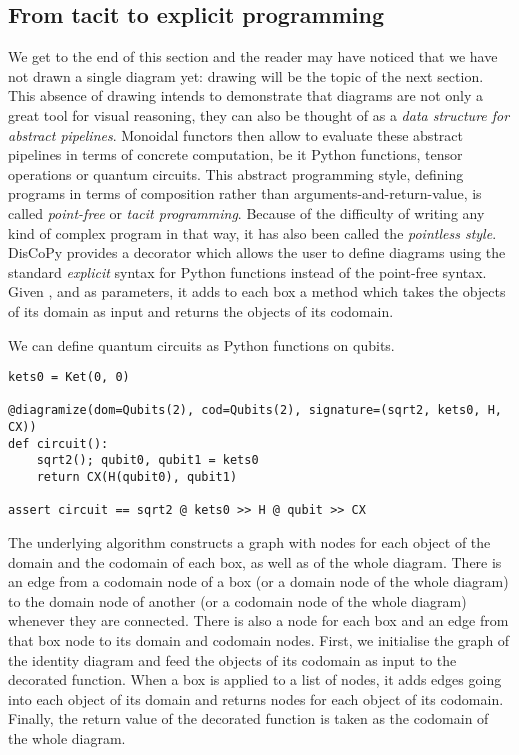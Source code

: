 \subsection{From tacit to explicit programming}\label{subsection:tacit-to-explicit}

We get to the end of this section and the reader may have noticed that we have not drawn a single diagram yet: drawing will be the topic of the next section.
This absence of drawing intends to demonstrate that diagrams are not only a great tool for visual reasoning, they can also be thought of as a \emph{data structure for abstract pipelines}.
Monoidal functors then allow to evaluate these abstract pipelines in terms of concrete computation, be it Python functions, tensor operations or quantum circuits.
This abstract programming style, defining programs in terms of composition rather than arguments-and-return-value, is called \emph{point-free} or \emph{tacit programming}.
Because of the difficulty of writing any kind of complex program in that way, it has also been called the \emph{pointless style}.
DisCoPy provides a  decorator which allows the user to define diagrams using the standard \emph{explicit} syntax for Python functions instead of the point-free syntax.
Given ,  and  as parameters, it adds to each box a  method which takes the objects of its domain as input and returns the objects of its codomain.

\begin{example}
We can define quantum circuits as Python functions on qubits.

\begin{verbatim}
kets0 = Ket(0, 0)

@diagramize(dom=Qubits(2), cod=Qubits(2), signature=(sqrt2, kets0, H, CX))
def circuit():
    sqrt2(); qubit0, qubit1 = kets0
    return CX(H(qubit0), qubit1)

assert circuit == sqrt2 @ kets0 >> H @ qubit >> CX
\end{verbatim}
\end{example}

The underlying algorithm constructs a graph with nodes for each object of the domain and the codomain of each box, as well as of the whole diagram.
There is an edge from a codomain node of a box (or a domain node of the whole diagram) to the domain node of another (or a codomain node of the whole diagram) whenever they are connected.
There is also a node for each box and an edge from that box node to its domain and codomain nodes.
First, we initialise the graph of the identity diagram and feed the objects of its codomain as input to the decorated function.
When a box is applied to a list of nodes, it adds edges going into each object of its domain and returns nodes for each object of its codomain.
Finally, the return value of the decorated function is taken as the codomain of the whole diagram.

